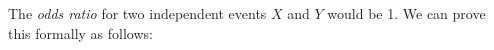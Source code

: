 \documentclass[nocolor]{report}
\begin{document}
\begin{ex}[Question 3b] 
\end{ex}
\vspace{-10pt}
\begin{soln}
    The \textit{odds ratio} for two independent events $X$ and $Y$ would be 1. We can prove this formally as follows:
\end{soln}
\end{document}
